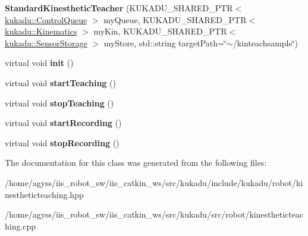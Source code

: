 \begin{DoxyCompactItemize}
\item 
{\bfseries Standard\+Kinesthetic\+Teacher} (K\+U\+K\+A\+D\+U\+\_\+\+S\+H\+A\+R\+E\+D\+\_\+\+P\+TR$<$ \hyperlink{classkukadu_1_1ControlQueue}{kukadu\+::\+Control\+Queue} $>$ my\+Queue, K\+U\+K\+A\+D\+U\+\_\+\+S\+H\+A\+R\+E\+D\+\_\+\+P\+TR$<$ \hyperlink{classkukadu_1_1Kinematics}{kukadu\+::\+Kinematics} $>$ my\+Kin, K\+U\+K\+A\+D\+U\+\_\+\+S\+H\+A\+R\+E\+D\+\_\+\+P\+TR$<$ \hyperlink{classkukadu_1_1SensorStorage}{kukadu\+::\+Sensor\+Storage} $>$ my\+Store, std\+::string target\+Path=\char`\"{}$\sim$/kinteachsample\char`\"{})\hypertarget{classkukadu_1_1StandardKinestheticTeacher_ad85d12e02c707e09229d9c48cbd73f06}{}\label{classkukadu_1_1StandardKinestheticTeacher_ad85d12e02c707e09229d9c48cbd73f06}

\item 
virtual void {\bfseries init} ()\hypertarget{classkukadu_1_1StandardKinestheticTeacher_aaeb801b4065d9b25a913249bb6551a04}{}\label{classkukadu_1_1StandardKinestheticTeacher_aaeb801b4065d9b25a913249bb6551a04}

\item 
virtual void {\bfseries start\+Teaching} ()\hypertarget{classkukadu_1_1StandardKinestheticTeacher_afc77ea3d464cff8001d240d6aca7dd4f}{}\label{classkukadu_1_1StandardKinestheticTeacher_afc77ea3d464cff8001d240d6aca7dd4f}

\item 
virtual void {\bfseries stop\+Teaching} ()\hypertarget{classkukadu_1_1StandardKinestheticTeacher_a1148b0689681b5418bc74fa5af730840}{}\label{classkukadu_1_1StandardKinestheticTeacher_a1148b0689681b5418bc74fa5af730840}

\item 
virtual void {\bfseries start\+Recording} ()\hypertarget{classkukadu_1_1StandardKinestheticTeacher_a43899c6af44e5e88ae46d0ad5e314e30}{}\label{classkukadu_1_1StandardKinestheticTeacher_a43899c6af44e5e88ae46d0ad5e314e30}

\item 
virtual void {\bfseries stop\+Recording} ()\hypertarget{classkukadu_1_1StandardKinestheticTeacher_a44465b867c658db78827baf54b537eef}{}\label{classkukadu_1_1StandardKinestheticTeacher_a44465b867c658db78827baf54b537eef}

\end{DoxyCompactItemize}


The documentation for this class was generated from the following files\+:\begin{DoxyCompactItemize}
\item 
/home/agyss/iis\+\_\+robot\+\_\+sw/iis\+\_\+catkin\+\_\+ws/src/kukadu/include/kukadu/robot/kinestheticteaching.\+hpp\item 
/home/agyss/iis\+\_\+robot\+\_\+sw/iis\+\_\+catkin\+\_\+ws/src/kukadu/src/robot/kinestheticteaching.\+cpp\end{DoxyCompactItemize}
